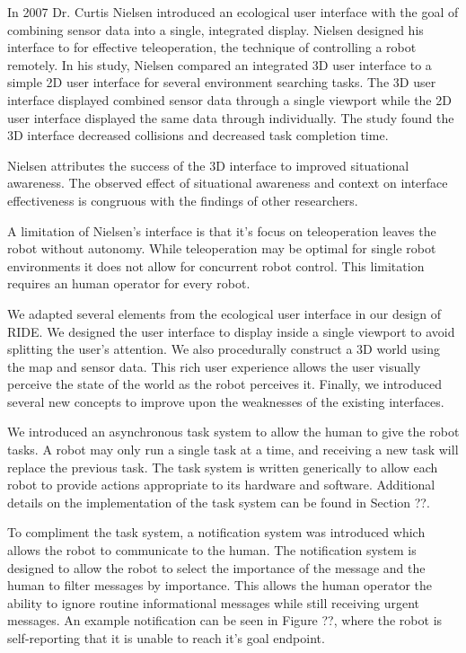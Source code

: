 In 2007 Dr. Curtis Nielsen introduced an ecological user interface with the goal of combining sensor data into a single, integrated display. Nielsen designed his interface to for effective teleoperation, the technique of controlling a robot remotely. In his study, Nielsen compared an integrated 3D user interface to a simple 2D user interface for several environment searching tasks. The 3D user interface displayed combined sensor data through a single viewport while the 2D user interface displayed the same data through individually. The study found the 3D interface decreased collisions and decreased task completion time.

Nielsen attributes the success of the 3D interface to improved situational awareness. The observed effect of situational awareness and context on interface effectiveness is congruous with the findings of other researchers.

A limitation of Nielsen's interface is that it's focus on teleoperation leaves the robot without autonomy. While teleoperation may be optimal for single robot environments it does not allow for concurrent robot control. This limitation requires an human operator for every robot.

We adapted several elements from the ecological user interface in our design of RIDE. We designed the user interface to display inside a single viewport to avoid splitting the user's attention. We also procedurally construct a 3D world using the map and sensor data. This rich user experience allows the user visually perceive the state of the world as the robot perceives it. Finally, we introduced several new concepts to improve upon the weaknesses of the existing interfaces. 

We introduced an asynchronous task system to allow the human to give the robot tasks. A robot may only run a single task at a time, and receiving a new task will replace the previous task. The task system is written generically to allow each robot to provide actions appropriate to its hardware and software. Additional details on the implementation of the task system can be found in Section ??.

To compliment the task system, a notification system was introduced which allows the robot to communicate to the human. The notification system is designed to allow the robot to select the importance of the message and the human to filter messages by importance. This allows the human operator the ability to ignore routine informational messages while still receiving urgent messages. An example notification can be seen in Figure ??, where the robot is self-reporting that it is unable to reach it's goal endpoint.


